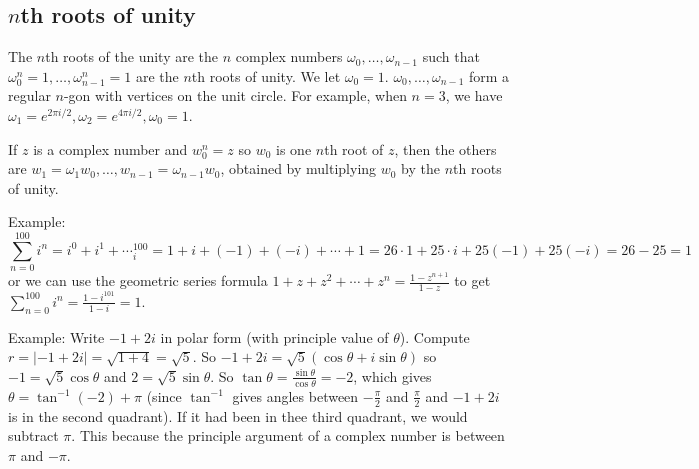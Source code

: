 \documentclass{article}
\theoremstyle{plain}
\theoremstyle{remark}
\begin{document}
\subsection{$n$th roots of unity}
The $n$th roots of the unity are the $n$ complex numbers $\omega_0,\dots,\omega_{n-1}$
such that $\omega_0^n = 1, \dots, \omega_{n-1}^n = 1$ are the $n$th roots of unity.
We let $\omega_0 = 1$. $\omega_0,\dots,\omega_{n-1}$ form a regular $n$-gon
with vertices on the unit circle.
For example, when $n = 3$, we have
$\omega_1 = e^{2\pi i/2}, \omega_2 = e^{4\pi i/2}, \omega_0 = 1$.

If $z$ is a complex number and $w_0^n = z$ so $w_0$ is one $n$th root of $z$,
then the others are $w_1 = \omega_1w_0, \dots, w_{n-1} = \omega_{n-1}w_0$,
obtained by multiplying $w_0$ by the $n$th roots of unity.

Example:
\[
	\sum_{n=0}^{100} i^n =  i^0 + i^1 + \cdots _ i^{100}
	= 1 + i + (-1) + (-i) + \cdots + 1
	= 26\cdot 1 + 25\cdot i + 25(-1) + 25(-i)
	= 26 - 25 = 1
\]
or we can use the geometric series formula
$1 + z + z^2 + \cdots + z^n = \frac{1-z^{n+1}}{1-z}$ to get
$\sum_{n=0}^{100}i^n = \frac{1-i^{101}}{1-i} = 1$.

Example: Write $-1 + 2i$ in polar form (with principle value of $\theta$).
Compute $r = \lvert -1 + 2i \rvert = \sqrt{1 + 4} = \sqrt{5}$.
So $-1 + 2i = \sqrt{5}\left(\cos\theta + i\sin\theta\right)$
so $-1 = \sqrt{5}\cos\theta$ and $2 = \sqrt{5}\sin\theta$.
So $\tan \theta = \frac{\sin\theta}{\cos\theta} = -2$,
which gives $\theta = \tan^{-1}(-2) + \pi$
(since $\tan^{-1}$ gives angles between $-\frac{\pi}{2}$ and $\frac{\pi}{2}$
and $-1 + 2i$ is in the second quadrant).
If it had been in thee third quadrant, we would subtract $\pi$.
This because the principle argument of a complex number is between $\pi$ and $-\pi$.
\end{document}
